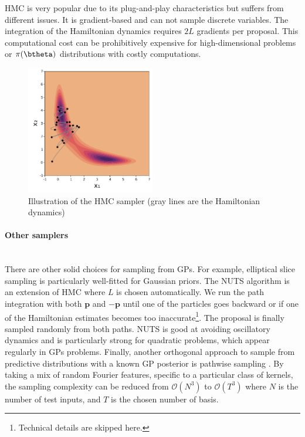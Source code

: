 \ac{HMC} is very popular due to its plug-and-play characteristics but suffers from different issues.
It is gradient-based and can not sample discrete variables.
The integration of the Hamiltonian dynamics requires $2L$ gradients per proposal.
This computational cost can be prohibitively expensive for high-dimensional problems or $\pi(\btheta)$ distributions with costly computations.

\begin{figure}[H]
    \centering
\includegraphics[width=0.5\textwidth]{./chapters/2_background/figures/hmc_sampling.pdf}
\caption{Illustration of the HMC sampler (gray lines are the Hamiltonian dynamics)}
\label{fig:hmc}
\end{figure}


\paragraph{Other samplers}\mbox{}\\
There are other solid choices for sampling from \ac{GPs}.
For example, elliptical slice sampling \citet{murray2010elliptical} is particularly well-fitted for Gaussian priors.
The \ac{NUTS} algorithm \cite{hoffman2014no} is an extension of \ac{HMC} where $L$ is chosen automatically.
We run the path integration with both $\boldsymbol{p}$ and $-\boldsymbol{p}$ until one of the particles goes backward or if one of the Hamiltonian estimates becomes too inaccurate\footnote{Technical details are skipped here.}.
The proposal is finally sampled randomly from both paths.
\ac{NUTS} is good at avoiding oscillatory dynamics and is particularly strong for quadratic problems, which appear regularly in \ac{GPs} problems.
Finally, another orthogonal approach to sample from predictive distributions with a known \ac{GP} posterior is pathwise sampling \cite{wilson2021pathwise}.
By taking a mix of random Fourier features, specific to a particular class of kernels, the sampling complexity can be reduced from $\mathcal{O}(N^3)$ to $\mathcal{O}(T^3)$ where $N$ is the number of test inputs, and $T$ is the chosen number of basis.

